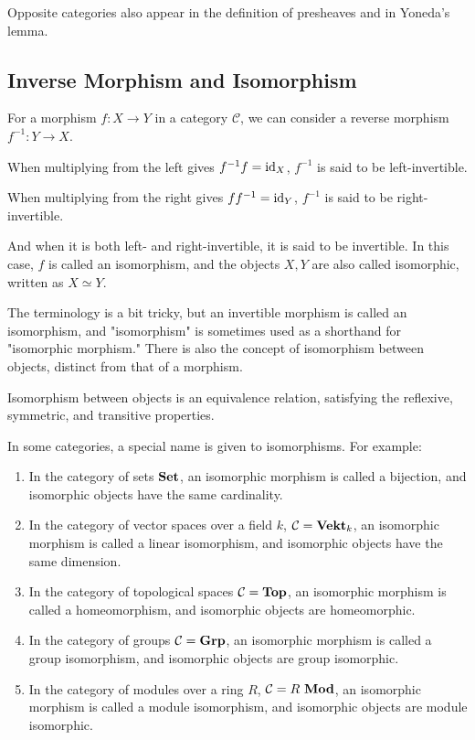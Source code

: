 \documentclass[uplatex,a4j,12pt,dvipdfmx]{jsarticle}
\begin{document}
Opposite categories also appear in the definition of presheaves and in Yoneda's lemma.

\subsection{Inverse Morphism and Isomorphism}

For a morphism $f: X \to Y$ in a category ${\mathcal C}$, we can consider a reverse morphism $f^{-1}: Y \to X$.

When multiplying from the left gives $f^{-1} f = {\rm id}_{X}$, $f^{-1}$ is said to be left-invertible.

When multiplying from the right gives $ff^{-1} = {\rm id}_{Y}$, $f^{-1}$ is said to be right-invertible.

And when it is both left- and right-invertible, it is said to be invertible.
In this case, $f$ is called an isomorphism, and the objects $X, Y$ are also called isomorphic, written as $X \simeq Y$.

The terminology is a bit tricky, but an invertible morphism is called an isomorphism, and "isomorphism" is sometimes used as a shorthand for "isomorphic morphism." There is also the concept of isomorphism between objects, distinct from that of a morphism.

Isomorphism between objects is an equivalence relation, satisfying the reflexive, symmetric, and transitive properties.

In some categories, a special name is given to isomorphisms.
For example:

\begin{enumerate}
    \item In the category of sets ${\bf Set}$, an isomorphic morphism is called a bijection, and isomorphic objects have the same cardinality.
    \item In the category of vector spaces over a field $k$, ${\mathcal C} = {\bf Vekt}_{k}$, an isomorphic morphism is called a linear isomorphism, and isomorphic objects have the same dimension.
    \item In the category of topological spaces ${\mathcal C} = {\bf Top}$, an isomorphic morphism is called a homeomorphism, and isomorphic objects are homeomorphic.
    \item In the category of groups ${\mathcal C} = {\bf Grp}$, an isomorphic morphism is called a group isomorphism, and isomorphic objects are group isomorphic.
    \item In the category of modules over a ring $R$, ${\mathcal C} = R \ {\bf Mod}$, an isomorphic morphism is called a module isomorphism, and isomorphic objects are module isomorphic.
\end{enumerate}
\end{document}
